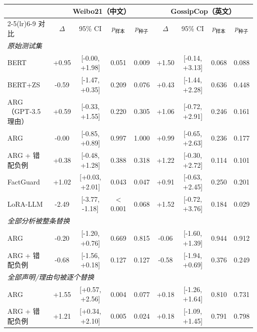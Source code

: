 \begin{tabular}{lcccccccc}
\toprule
 & \multicolumn{4}{c}{Weibo21（中文）} & \multicolumn{4}{c}{GossipCop（英文）} \\
\cmidrule(lr){2-5}\cmidrule(lr){6-9}
\method{} 对比 & $\Delta$ & 95\% CI & $p_{\text{样本}}$ & $p_{\text{种子}}$ & $\Delta$ & 95\% CI & $p_{\text{样本}}$ & $p_{\text{种子}}$ \\
\midrule
\multicolumn{9}{l}{\emph{原始测试集}} \\
BERT & +0.95 & [-0.00, +1.98] & 0.051 & 0.009 & +1.50 & [-0.14, +3.13] & 0.068 & 0.088 \\
BERT+ZS & -0.59 & [-1.47, +0.35] & 0.209 & 0.076 & +0.43 & [-1.44, +2.28] & 0.636 & 0.448 \\
ARG（GPT-3.5 理由） & +0.59 & [-0.33, +1.55] & 0.220 & 0.305 & +1.06 & [-0.72, +2.91] & 0.246 & 0.161 \\
ARG & -0.00 & [-0.85, +0.89] & 0.997 & 1.000 & +0.99 & [-0.65, +2.63] & 0.236 & 0.177 \\
ARG + 错配负例 & +0.38 & [-0.48, +1.28] & 0.388 & 0.318 & +1.22 & [-0.30, +2.72] & 0.114 & 0.101 \\
FactGuard & +1.02 & [+0.03, +2.01] & 0.043 & 0.047 & +0.91 & [-0.63, +2.45] & 0.250 & 0.201 \\
LoRA-LLM & -2.49 & [-3.77, -1.18] & $<$0.001 & 0.068 & +1.52 & [-0.72, +3.76] & 0.184 & 0.029 \\
\midrule
\multicolumn{9}{l}{\emph{全部分析被整条替换}} \\
ARG & -0.20 & [-1.20, +0.76] & 0.669 & 0.815 & -0.06 & [-1.60, +1.39] & 0.944 & 0.912 \\
ARG + 错配负例 & -0.68 & [-1.56, +0.18] & 0.127 & 0.127 & -0.58 & [-1.94, +0.69] & 0.376 & 0.249 \\
\midrule
\multicolumn{9}{l}{\emph{全部声明/理由句被逐个替换}} \\
ARG & +1.55 & [+0.57, +2.56] & 0.004 & 0.077 & +0.18 & [-1.26, +1.64] & 0.810 & 0.731 \\
ARG + 错配负例 & +1.21 & [+0.34, +2.10] & 0.005 & 0.024 & +0.18 & [-1.09, +1.45] & 0.791 & 0.798 \\
\bottomrule
\end{tabular}
